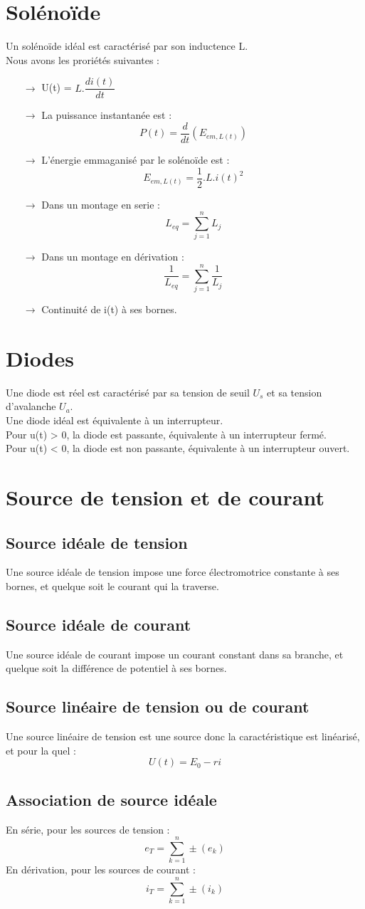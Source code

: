 \section{Solénoïde}
Un solénoïde idéal est caractérisé par son inductence L.\\
Nous avons les proriétés suivantes :\\
\begin{itemize}
 \item[$\rightarrow$] U(t) = $L.\dfrac{di(t)}{dt}$ \\
 \item[$\rightarrow$] La puissance instantanée est : $$P(t) = \dfrac{d}{dt}(E_{em,L(t)})$$
 \item[$\rightarrow$] L'énergie emmaganisé par le solénoïde est : $$E_{em,L(t)} = \dfrac{1}{2}.L.i(t)^2$$
 \item[$\rightarrow$] Dans un montage en serie : $$L_{eq} = \sum_{j=1}^n L_j$$
 \item[$\rightarrow$] Dans un montage en dérivation : $$\dfrac{1}{L_{eq}} = \sum_{j=1}^n \dfrac{1}{L_j}$$
 \item[$\rightarrow$] Continuité de i(t) à ses bornes.
\end{itemize}
\section{Diodes}
Une diode est réel est caractérisé par sa tension de seuil $U_s$ et sa tension d'avalanche $U_a$.\\
Une diode idéal est équivalente à un interrupteur.\\ Pour u(t) > 0, la diode est passante, équivalente à un interrupteur fermé.\\ Pour u(t) < 0, la diode est non passante, équivalente à un interrupteur ouvert.
\section{Source de tension et de courant}
\subsection{Source idéale de tension}
Une source idéale de tension impose une force électromotrice constante à ses bornes, et quelque soit le courant qui la traverse.
\subsection{Source idéale de courant}
Une source idéale de courant impose un courant constant dans sa branche, et quelque soit la différence de potentiel à ses bornes.
\subsection{Source linéaire de tension ou de courant}
Une source linéaire de tension est une source donc la caractéristique est linéarisé, et pour la quel :
$$U(t) = E_0 - ri$$
\subsection{Association de source idéale}
En série, pour les sources de tension :
$$e_T = \sum_{k=1}^n \pm(e_k)$$
En dérivation, pour les sources de courant :
$$i_T = \sum_{k=1}^n \pm(i_k)$$
